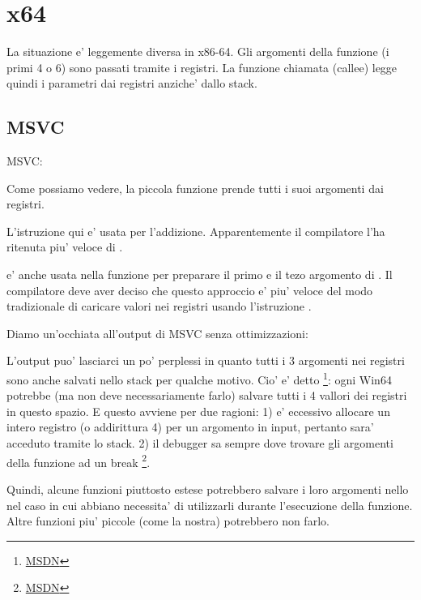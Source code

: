 \section{x64}


La situazione e' leggemente diversa in x86-64. Gli argomenti della funzione (i primi 4 o 6) 
sono passati tramite i registri. La funzione chiamata (\gls{callee}) legge quindi i parametri dai registri anziche' dallo stack.

\subsection{MSVC}

\Optimizing MSVC:



Come possiamo vedere, la piccola funzione \ttf prende tutti i suoi argomenti dai registri.

L'istruzione \LEA qui e' usata per l'addizione. Apparentemente il compilatore l'ha ritenuta piu' veloce di .

\LEA e' anche usata nella funzione \main per preparare il primo e il tezo argomento di \ttf.
Il compilatore deve aver deciso che questo approccio e' piu' veloce del modo tradizionale di caricare valori nei registri usando l'istruzione \MOV.

Diamo un'occhiata all'output di MSVC senza ottimizzazioni:



L'output puo' lasciarci un po' perplessi in quanto tutti i 3 argomenti nei registri sono anche salvati nello stack per qualche motivo. 
\label{shadow_space}
Cio' e' detto 
\footnote{\href{http://go.yurichev.com/17256}{MSDN}}: 
ogni Win64 potrebbe (ma non deve necessariamente farlo) salvare tutti i 4 vallori dei registri in questo spazio.
E questo avviene per due ragioni: 
1) e' eccessivo allocare un intero registro (o addirittura 4) per un argomento in input, pertanto sara' acceduto tramite lo stack.
2) il debugger sa sempre dove trovare gli argomenti della funzione ad un break
\footnote{\href{http://go.yurichev.com/17257}{MSDN}}.

Quindi, alcune funzioni piuttosto estese potrebbero salvare i loro argomenti nello  nel caso in cui 
abbiano necessita' di utilizzarli durante l'esecuzione della funzione. Altre funzioni piu' piccole (come la nostra) potrebbero non farlo.

